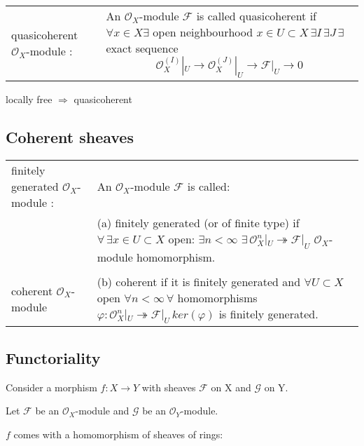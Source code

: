\documentclass[a4paper, 12pt]{article}
\newcommand{\ca}[1]{\mathcal{#1}}
\newcommand{\caf}{\mathcal{F}}
\newcommand{\cag}{\mathcal{G}}
\newcommand{\oxmod}{$\mathcal{O}_X$-module }
\newcommand{\ox}{\mathcal{O}_X}
\begin{document}
\begin{tabular}{p{4cm} p{12cm}}


quasicoherent \oxmod: & An \oxmod $\caf$ is called quasicoherent if $\forall x\in X \exists$ open neighbourhood $x\in U \subset X\,  \exists I\, \exists J\, \exists $ exact sequence
  \[
\ox^{(I)}|_U \longrightarrow \ox^{(J)}|_U \longrightarrow \caf|_U \longrightarrow 0
\]
\\
\end{tabular}


locally free $\Longrightarrow$ quasicoherent





\subsection{Coherent sheaves}

\begin{tabular}{p{4cm} p{12cm}}



finitely generated \oxmod : & An \oxmod $\caf$ is called: \\
  & (a) finitely generated (or of finite type) if $\forall\,\exists x\in U \subset X $
  open:
  $\exists n < \infty$ $\exists \, \ox^n|_U \twoheadrightarrow \caf|_U$  \oxmod  homomorphism.
\\

&\\

coherent \oxmod &(b) coherent if it is finitely generated and $\forall U \subset X $ open $\forall n < \infty \, \forall$
homomorphisms $\varphi : \ox^n|_U \twoheadrightarrow \caf|_U \, ker(\varphi)$ is
finitely generated. \\
\end{tabular}


%


  
  



\subsection{Functoriality}

Consider a morphism $f:X\longrightarrow Y$ with sheaves $\caf$ on X and $\cag$ on Y.

Let $\caf$ be an \oxmod and $\cag$ be an $\ca{O}_Y$-module.

$f$ comes with a homomorphism of sheaves of rings:
\end{document}
